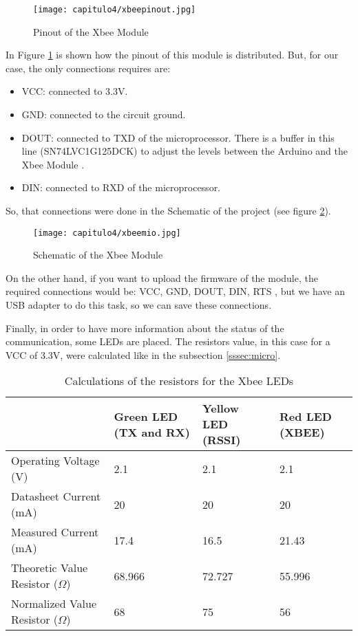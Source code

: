  
\begin{figure}[H]
	\centering
		\texttt{[image: capitulo4/xbeepinout.jpg]}
	\caption{Pinout of the Xbee Module \cite{xbee}}
	\label{fig:xbeetable}
\end{figure}

In Figure \ref{fig:xbeetable} is shown how the pinout of this module is distributed. But, for our case, the only connections requires are: \cite{xbee}
\begin{itemize}
\item VCC: connected to 3.3V.
\item GND: connected to the circuit ground.
\item DOUT: connected to TXD of the microprocessor. There is a buffer in this line (SN74LVC1G125DCK) to adjust the levels between the Arduino and the Xbee Module \cite{carlos} \cite{74LVC}. 
\item DIN: connected to RXD of the microprocessor.
\end{itemize}

So, that connections were done in the Schematic of the project (see figure \ref{fig:xbeemio}). 

\begin{figure}[H]
	\centering
		\texttt{[image: capitulo4/xbeemio.jpg]}
	\caption{Schematic of the Xbee Module}
	\label{fig:xbeemio}
\end{figure}


On the other hand, if you want to upload the firmware of the module, the required connections would be: VCC, GND, DOUT, DIN, RTS \cite{xbee}, but we have an USB adapter to do this task, so we can save these connections.

Finally, in order to have more information about the status of the communication, some LEDs are placed. The resistors value, in this case for a VCC of 3.3V, were calculated like in the subsection \ref{sssec:micro}.

\begin{table}[H]
\centering
\begin{tabular}{|l|l|l|l}
\hline
						& \textbf{Green LED (TX and RX)} & \textbf{Yellow LED (RSSI)} & \textbf{Red LED (XBEE)} \\ \hline
Operating Voltage (V) & 2.1							& 2.1    & 2.1   \\ \hline
Datasheet Current (mA) & 20							& 20   & 20    \\ \hline
Measured Current (mA) & 17.4							& 16.5   & 21.43  \\ \hline
Theoretic Value Resistor ($\Omega$) & 68.966						& 72.727  & 55.996   \\ \hline
Normalized Value Resistor ($\Omega$) & 68						& 75 & 56   \\ \hline
\end{tabular}
\caption{Calculations of the resistors for the Xbee LEDs}\label{tab:XbeeLEDsvalue}
\end{table}
 
